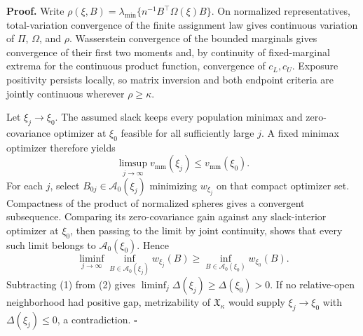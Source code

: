 \textbf{Proof.}
Write \(\rho(\xi,B)=\lambda_{\min}\{n^{-1}B^{\top}\Omega(\xi)B\}\).  On normalized representatives, total-variation convergence of the finite assignment law gives continuous variation of \(\Pi\), \(\Omega\), and \(\rho\).  Wasserstein convergence of the bounded marginals gives convergence of their first two moments and, by continuity of fixed-marginal extrema for the continuous product function, convergence of \(c_L,c_U\).  Exposure positivity persists locally, so matrix inversion and both endpoint criteria are jointly continuous wherever \(\rho\ge\kappa\).

Let \(\xi_j\to\xi_0\).  The assumed slack keeps every population minimax and zero-covariance optimizer at \(\xi_0\) feasible for all sufficiently large \(j\).  A fixed minimax optimizer therefore yields
\[
 \limsup_{j\to\infty}v_{\mathrm{mm}}(\xi_j)
 \le v_{\mathrm{mm}}(\xi_0).
\tag{1}
\]
For each \(j\), select \(B_{0j}\in\mathcal A_0(\xi_j)\) minimizing \(w_{\xi_j}\) on that compact optimizer set.  Compactness of the product of normalized spheres gives a convergent subsequence.  Comparing its zero-covariance gain against any slack-interior optimizer at \(\xi_0\), then passing to the limit by joint continuity, shows that every such limit belongs to \(\mathcal A_0(\xi_0)\).  Hence
\[
 \liminf_{j\to\infty}\inf_{B\in\mathcal A_0(\xi_j)}w_{\xi_j}(B)
 \ge \inf_{B\in\mathcal A_0(\xi_0)}w_{\xi_0}(B).
\tag{2}
\]
Subtracting (1) from (2) gives \(\liminf_j\Delta(\xi_j)\ge\Delta(\xi_0)>0\).  If no relative-open neighborhood had positive gap, metrizability of \(\mathfrak X_\kappa\) would supply \(\xi_j\to\xi_0\) with \(\Delta(\xi_j)\le0\), a contradiction. \(\square\)